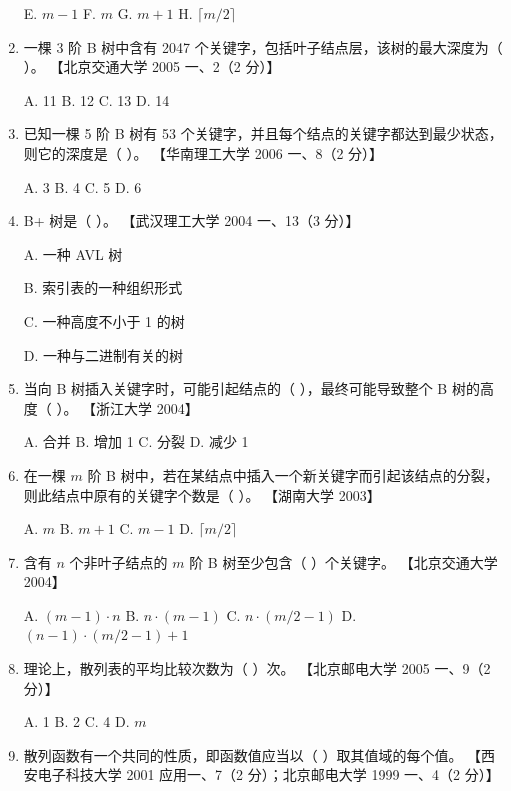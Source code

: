 \documentclass[lang=cn,newtx,10pt,scheme=chinese]{elegantbook}
\begin{document}
\begin{enumerate}
    E. $m-1$ \quad F. $m$ \quad G. $m+1$ \quad H. $\lceil m/2 \rceil$  

    \item 一棵 3 阶 B 树中含有 2047 个关键字，包括叶子结点层，该树的最大深度为（ ）。  
    【北京交通大学 2005 一、2（2 分）】  

    A. 11 \quad B. 12 \quad C. 13 \quad D. 14  

    \item 已知一棵 5 阶 B 树有 53 个关键字，并且每个结点的关键字都达到最少状态，则它的深度是（ ）。  
    【华南理工大学 2006 一、8（2 分）】  

    A. 3 \quad B. 4 \quad C. 5 \quad D. 6  

    \item B+ 树是（ ）。  
    【武汉理工大学 2004 一、13（3 分）】  

    A. 一种 AVL 树  

    B. 索引表的一种组织形式  

    C. 一种高度不小于 1 的树  

    D. 一种与二进制有关的树  

    \item 当向 B 树插入关键字时，可能引起结点的（ ），最终可能导致整个 B 树的高度（ ）。  
    【浙江大学 2004】  

    A. 合并 \quad B. 增加 1 \quad C. 分裂 \quad D. 减少 1  

    \item 在一棵 $m$ 阶 B 树中，若在某结点中插入一个新关键字而引起该结点的分裂，则此结点中原有的关键字个数是（ ）。  
    【湖南大学 2003】 

    A. $m$ \quad B. $m+1$ \quad C. $m-1$ \quad D. $\lceil m/2 \rceil$  

    \item 含有 $n$ 个非叶子结点的 $m$ 阶 B 树至少包含（ ）个关键字。  
    【北京交通大学 2004】 

    A. $(m-1) \cdot n$ \quad B. $n \cdot (m-1)$  \quad C. $n \cdot (m/2 - 1)$ \quad D. $(n-1) \cdot (m/2 - 1) + 1$

    \item 理论上，散列表的平均比较次数为（ ）次。  
    【北京邮电大学 2005 一、9（2 分）】  

    A. 1 \quad B. 2 \quad C. 4 \quad D. $m$  

    \item 散列函数有一个共同的性质，即函数值应当以（ ）取其值域的每个值。  
    【西安电子科技大学 2001 应用一、7（2 分）；北京邮电大学 1999 一、4（2 分）】  


\end{enumerate}
\end{document}
